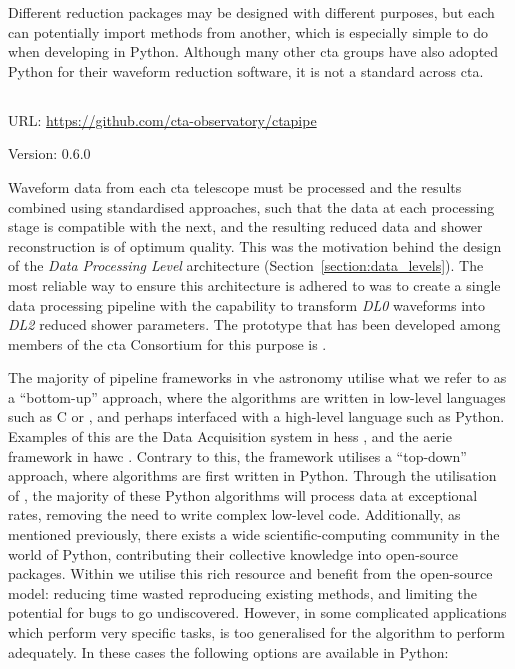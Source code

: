 Different reduction packages may be designed with different purposes, but each can potentially import methods from another, which is especially simple to do when developing in Python. Although many other \gls{cta} groups have also adopted Python for their waveform reduction software, it is not a standard across \gls{cta}.

\subsection{}
\vspace{-0.7em}
\noindent \hspace{\parindent} {\tiny URL: \url{https://github.com/cta-observatory/ctapipe} \par}
\noindent \hspace{\parindent} {\tiny Version: 0.6.0 \par}

\noindent Waveform data from each \gls{cta} telescope must be processed and the results combined using standardised approaches, such that the data at each processing stage is compatible with the next, and the resulting reduced data and shower reconstruction is of optimum quality. This was the motivation behind the design of the \textit{Data Processing Level} architecture (Section~\ref{section:data_levels}). The most reliable way to ensure this architecture is adhered to was to create a single data processing pipeline with the capability to transform \textit{DL0} waveforms into \textit{DL2} reduced shower parameters. The prototype that has been developed among members of the \gls{cta} Consortium for this purpose is .

The majority of pipeline frameworks in \gls{vhe} astronomy utilise what we refer to as a ``bottom-up'' approach, where the algorithms are written in low-level languages such as C or \cpp, and perhaps interfaced with a high-level language such as Python. Examples of this are the Data Acquisition system in \gls{hess} \cite{Balzer2014}, and the \gls{aerie} framework in \gls{hawc} \cite{Abeysekara2018}. Contrary to this, the  framework utilises a ``top-down'' approach, where algorithms are first written in Python. Through the utilisation of , the majority of these Python algorithms will process data at exceptional rates, removing the need to write complex low-level code. Additionally, as mentioned previously, there exists a wide scientific-computing community in the world of Python, contributing their collective knowledge into open-source packages. Within  we utilise this rich resource and benefit from the open-source model: reducing time wasted reproducing existing methods, and limiting the potential for bugs to go undiscovered. However, in some complicated applications which perform very specific tasks,  is too generalised for the algorithm to perform adequately. In these cases the following options are available in Python:

